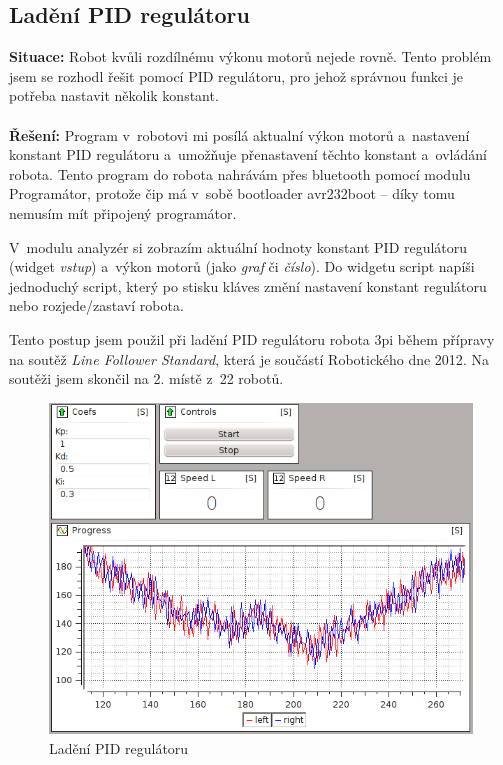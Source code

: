 \documentclass[12pt, a4paper, oneside]{article}
\newcommand{\It}{\textit}  %
\begin{document}
\newpage
\subsection{Ladění PID regulátoru}
{\bf Situace:} Robot kvůli rozdílnému výkonu motorů nejede rovně. Tento problém jsem se rozhodl řešit pomocí PID regulátoru, pro jehož správnou funkci je potřeba nastavit několik konstant. \\
\\
{\bf Řešení:} Program v~robotovi mi posílá aktualní výkon motorů a~nastavení konstant PID regulátoru a~umožňuje přenastavení těchto konstant a~ovládání robota. Tento program do robota nahrávám přes bluetooth pomocí modulu Programátor, protože čip má v~sobě bootloader avr232boot -- díky tomu nemusím mít připojený programátor.  

V~modulu analyzér si zobrazím aktuální hodnoty konstant PID regulátoru (widget \It{vstup}) a~výkon motorů (jako \It{graf} či \It{číslo}). Do widgetu script napíši jednoduchý script, který po stisku kláves změní nastavení konstant regulátoru nebo rozjede/zastaví robota.

Tento postup jsem použil při ladění PID regulátoru robota 3pi\cite{3pi} během přípravy na soutěž \It{Line Follower Standard}, která je součástí Robotického dne 2012\cite{rob_den}. Na soutěži jsem skončil na 2. místě z~22 robotů\cite{robotday_res}.
\begin{figure}[H]
\begin{center}
\includegraphics[scale=0.55]{img/use_pid.png}
\caption{Ladění PID regulátoru}
\end{center}
\end{figure}
\end{document}
